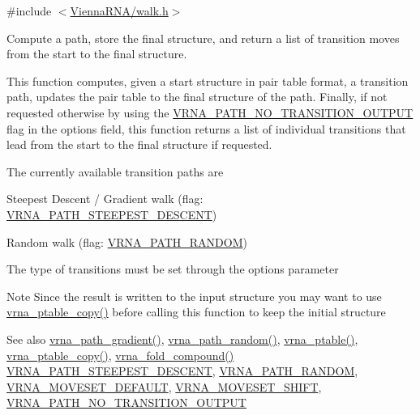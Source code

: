 {\ttfamily \#include $<$\hyperlink{walk_8h}{Vienna\+R\+N\+A/walk.\+h}$>$}



Compute a path, store the final structure, and return a list of transition moves from the start to the final structure. 

This function computes, given a start structure in pair table format, a transition path, updates the pair table to the final structure of the path. Finally, if not requested otherwise by using the \hyperlink{group__paths_ga1ee63e54ecf136491e12ff03ede2622d}{V\+R\+N\+A\+\_\+\+P\+A\+T\+H\+\_\+\+N\+O\+\_\+\+T\+R\+A\+N\+S\+I\+T\+I\+O\+N\+\_\+\+O\+U\+T\+P\+UT} flag in the {\ttfamily options} field, this function returns a list of individual transitions that lead from the start to the final structure if requested.

The currently available transition paths are
\begin{DoxyItemize}
\item Steepest Descent / Gradient walk (flag\+: \hyperlink{group__paths_ga705cea2b3243a38a2d6e3b1e141ed061}{V\+R\+N\+A\+\_\+\+P\+A\+T\+H\+\_\+\+S\+T\+E\+E\+P\+E\+S\+T\+\_\+\+D\+E\+S\+C\+E\+NT})
\item Random walk (flag\+: \hyperlink{group__paths_ga0b84bd36bfd783130297797c51dd85ae}{V\+R\+N\+A\+\_\+\+P\+A\+T\+H\+\_\+\+R\+A\+N\+D\+OM})
\end{DoxyItemize}

The type of transitions must be set through the {\ttfamily options} parameter

\begin{DoxyNote}{Note}
Since the result is written to the input structure you may want to use \hyperlink{group__struct__utils_ga2daefbbd6d9f8803731651882f54332d}{vrna\+\_\+ptable\+\_\+copy()} before calling this function to keep the initial structure
\end{DoxyNote}
\begin{DoxySeeAlso}{See also}
\hyperlink{group__paths_gafa18d5153ee540ddd9b93aba59d26184}{vrna\+\_\+path\+\_\+gradient()}, \hyperlink{group__paths_ga49cfe462288be44e0dd88c96da79acbf}{vrna\+\_\+path\+\_\+random()}, \hyperlink{group__struct__utils_gae829fb8bb7f694c12a9c0bbc34c77c60}{vrna\+\_\+ptable()}, \hyperlink{group__struct__utils_ga2daefbbd6d9f8803731651882f54332d}{vrna\+\_\+ptable\+\_\+copy()}, \hyperlink{group__fold__compound_ga6601d994ba32b11511b36f68b08403be}{vrna\+\_\+fold\+\_\+compound()} \hyperlink{group__paths_ga705cea2b3243a38a2d6e3b1e141ed061}{V\+R\+N\+A\+\_\+\+P\+A\+T\+H\+\_\+\+S\+T\+E\+E\+P\+E\+S\+T\+\_\+\+D\+E\+S\+C\+E\+NT}, \hyperlink{group__paths_ga0b84bd36bfd783130297797c51dd85ae}{V\+R\+N\+A\+\_\+\+P\+A\+T\+H\+\_\+\+R\+A\+N\+D\+OM}, \hyperlink{group__neighbors_gaa5ffec4dd0d02df320f123e6888154d1}{V\+R\+N\+A\+\_\+\+M\+O\+V\+E\+S\+E\+T\+\_\+\+D\+E\+F\+A\+U\+LT}, \hyperlink{group__neighbors_ga68ea27c81de4b74e48b775c04052590b}{V\+R\+N\+A\+\_\+\+M\+O\+V\+E\+S\+E\+T\+\_\+\+S\+H\+I\+FT}, \hyperlink{group__paths_ga1ee63e54ecf136491e12ff03ede2622d}{V\+R\+N\+A\+\_\+\+P\+A\+T\+H\+\_\+\+N\+O\+\_\+\+T\+R\+A\+N\+S\+I\+T\+I\+O\+N\+\_\+\+O\+U\+T\+P\+UT}
\end{DoxySeeAlso}

